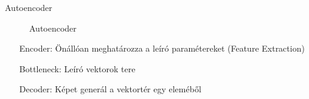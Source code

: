 \documentclass[aspectratio=169]{beamer}
\begin{document}
\begin{frame}{Autoencoder}
\begin{figure}
\begin{subfigure}{0.2\textwidth}
        \end{subfigure}
        \caption*{Autoencoder\footnotemark}
    \end{figure}
    \begin{itemize}
        \setlength{\itemindent}{4em}
        \item [Encoder:] Önállóan meghatározza a leíró paramétereket (Feature Extraction)
        \item [Bottleneck:] Leíró vektorok tere
        \item [Decoder:] Képet generál a vektortér egy eleméből
    \end{itemize}
\end{frame}
\end{document}
